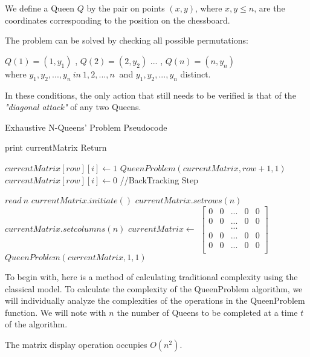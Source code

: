 We define a Queen $Q$ by the pair on points $ (x, y) $, where $ x, y \leq n $, are the coordinates corresponding to the position on the chessboard.

The problem can be solved by checking all possible permutations: 

$ Q (1) = (1, y_1) $ , $ Q (2) = (2, y_2) $ ... , $ Q (n) = (n, y_n) $ \\
where $ y_1, y_2, ..., y_n \ in \ { 1,2, ..., n \ } $ and $ y_1, y_2, ..., y_n $ distinct. 

In these conditions, the only action that still needs to be verified is that of the \textit{"diagonal attack"} of any two Queens.

\begin{algorithm}[H]
\caption{Exhaustive N-Queens’ Problem Pseudocode}
\begin{algorithmic}[1]
	\State print currentMatrix
	\State Return

\EndIf
{}
		\State $currentMatrix[row][i] \gets 1$
		\State $QueenProblem(currentMatrix,row+1,1)$
		\State $currentMatrix[row][i] \gets 0$
		//BackTracking Step
	\EndIf
\EndFor
\EndProcedure
{}


\State $read\ n$
\State $currentMatrix.initiate()$
\State $currentMatrix.setrows(n)$
\State $currentMatrix.setcolumns(n)$
\State $currentMatrix \gets$
$\left[\begin{array}{ccccc}
0 & 0 & ... & 0 & 0	\\
0 & 0 & ... & 0 & 0	\\
 &  & ... &  & 	\\
0 & 0 & ... & 0 & 0	\\
0 & 0 & ... & 0 & 0	\\
\end{array}\right]$ 
\State $QueenProblem(currentMatrix,1,1)$
\EndProcedure
\end{algorithmic}
\end{algorithm}

To begin with, here is a method of calculating traditional complexity using the classical model.
To calculate the complexity of the QueenProblem algorithm, we will individually analyze the complexities of the operations in the QueenProblem function. We will note with $n$ the number of Queens to be completed at a time $ t $ of the algorithm.

The matrix display operation occupies $ O (n ^ 2) $.

